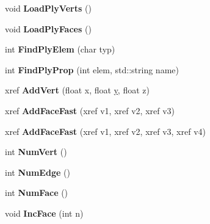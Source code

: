 \begin{DoxyCompactItemize}
\item 
\hypertarget{class_mesh_ad6205f7fe1207483dadac518eb05ffd6}{void {\bfseries Load\+Ply\+Verts} ()}\label{class_mesh_ad6205f7fe1207483dadac518eb05ffd6}

\item 
\hypertarget{class_mesh_a58736f94c9ec193835282335bc3cf297}{void {\bfseries Load\+Ply\+Faces} ()}\label{class_mesh_a58736f94c9ec193835282335bc3cf297}

\item 
\hypertarget{class_mesh_af7377e867ac20fa8d03aeeedcdeb610c}{int {\bfseries Find\+Ply\+Elem} (char typ)}\label{class_mesh_af7377e867ac20fa8d03aeeedcdeb610c}

\item 
\hypertarget{class_mesh_ad18bcbb527304dd391e97da1f5fead8e}{int {\bfseries Find\+Ply\+Prop} (int elem, std\+::string name)}\label{class_mesh_ad18bcbb527304dd391e97da1f5fead8e}

\item 
\hypertarget{class_mesh_a19bf8b067803fe9c3ab939561ead3c4a}{xref {\bfseries Add\+Vert} (float x, float \hyperlink{_ice_utils_8h_aa7ffaed69623192258fb8679569ff9ba}{y}, float z)}\label{class_mesh_a19bf8b067803fe9c3ab939561ead3c4a}

\item 
\hypertarget{class_mesh_a334e8124842dc8eb933f09511f5bba70}{xref {\bfseries Add\+Face\+Fast} (xref v1, xref v2, xref v3)}\label{class_mesh_a334e8124842dc8eb933f09511f5bba70}

\item 
\hypertarget{class_mesh_a23914a7808debaf99eda9ea615353336}{xref {\bfseries Add\+Face\+Fast} (xref v1, xref v2, xref v3, xref v4)}\label{class_mesh_a23914a7808debaf99eda9ea615353336}

\item 
\hypertarget{class_mesh_add95c202395311323ea25142c497b03f}{int {\bfseries Num\+Vert} ()}\label{class_mesh_add95c202395311323ea25142c497b03f}

\item 
\hypertarget{class_mesh_a0118a1423a9ee222b81e3d73d7ee52cc}{int {\bfseries Num\+Edge} ()}\label{class_mesh_a0118a1423a9ee222b81e3d73d7ee52cc}

\item 
\hypertarget{class_mesh_a5f448ed6931e0c78976f6af41aed83ae}{int {\bfseries Num\+Face} ()}\label{class_mesh_a5f448ed6931e0c78976f6af41aed83ae}

\item 
\hypertarget{class_mesh_a22f062ca9be2c2b873b7c0d8e7b96510}{void {\bfseries Inc\+Face} (int n)}\label{class_mesh_a22f062ca9be2c2b873b7c0d8e7b96510}


\end{DoxyCompactItemize}

